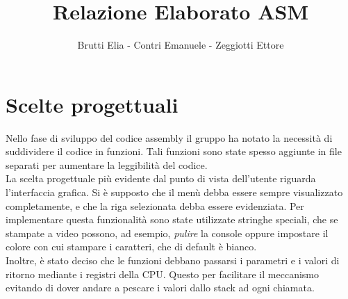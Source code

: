 \documentclass{article}
\title{Relazione Elaborato ASM}
\author{Brutti Elia - Contri Emanuele - Zeggiotti Ettore}
\begin{document}
\maketitle

\section{Scelte progettuali}
Nello fase di sviluppo del codice assembly il gruppo ha notato la necessità di suddividere il codice in funzioni. Tali funzioni sono state spesso aggiunte in file separati per aumentare la leggibilità del codice.
\\
La scelta progettuale più evidente dal punto di vista dell'utente riguarda l'interfaccia grafica. Si è supposto che il menù debba essere sempre visualizzato completamente, e che la riga selezionata debba essere evidenziata. Per implementare questa funzionalità sono state utilizzate stringhe speciali, che se stampate a video possono, ad esempio, \emph{pulire} la console oppure impostare il colore con cui stampare i caratteri, che di default è bianco.
\\
Inoltre, è stato deciso che le funzioni debbano passarsi i parametri e i valori di ritorno mediante i registri della CPU. Questo per facilitare il meccanismo evitando di dover andare a pescare i valori dallo stack ad ogni chiamata.
\end{document}
